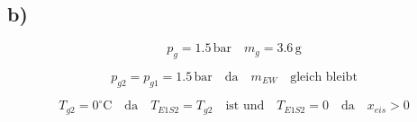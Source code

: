 

\subsection*{b)}
\[ p_{g} = 1.5 \, \text{bar} \quad m_{g} = 3.6 \, \text{g} \]

\[ p_{g2} = p_{g1} = 1.5 \, \text{bar} \quad \text{da} \quad m_{EW} \quad \text{gleich bleibt} \]

\[ T_{g2} = 0^\circ \text{C} \quad \text{da} \quad T_{E1S2} = T_{g2} \quad \text{ist und} \quad T_{E1S2} = 0 \quad \text{da} \quad x_{eis} > 0 \]